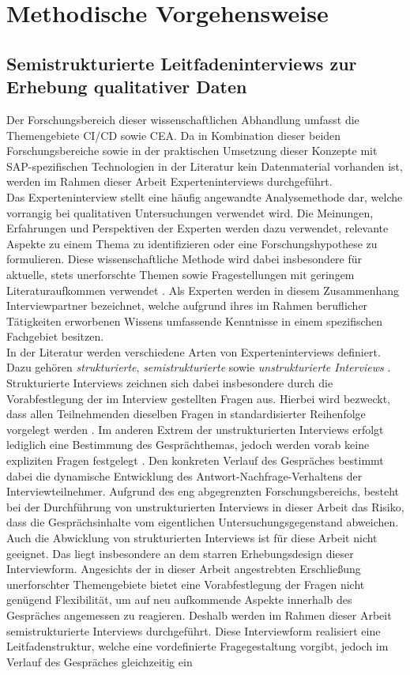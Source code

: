 \section{Methodische Vorgehensweise} 
\subsection{Semistrukturierte Leitfadeninterviews zur Erhebung qualitativer Daten}
Der Forschungsbereich dieser wissenschaftlichen Abhandlung umfasst die Themengebiete CI/CD sowie CEA. Da in Kombination dieser beiden Forschungsbereiche sowie in der praktischen Umsetzung dieser Konzepte mit SAP-spezifischen Technologien in der Literatur kein Datenmaterial vorhanden ist, werden im Rahmen dieser Arbeit Experteninterviews durchgeführt.\\ 
Das Experteninterview stellt eine häufig angewandte Analysemethode dar, welche vorrangig bei qualitativen Untersuchungen verwendet wird. Die Meinungen, Erfahrungen und Perspektiven der Experten werden dazu verwendet, relevante Aspekte zu einem Thema zu identifizieren oder eine Forschungshypothese zu formulieren. Diese wissenschaftliche Methode wird dabei insbesondere für aktuelle, stets unerforschte Themen sowie Fragestellungen mit geringem Literaturaufkommen verwendet \cite[S. 33 ff.]{Kaiser.2021}. Als Experten werden in diesem Zusammenhang Interviewpartner bezeichnet, welche aufgrund ihres im Rahmen beruflicher Tätigkeiten erworbenen Wissens umfassende Kenntnisse in einem spezifischen Fachgebiet besitzen.\\ In der Literatur werden verschiedene Arten von Experteninterviews definiert. Dazu gehören \textit{strukturierte}, \textit{semistrukturierte} sowie \textit{unstrukturierte Interviews} \cite[S. 84 ff.]{Kaiser.2021}. Strukturierte Interviews zeichnen sich dabei insbesondere durch die Vorabfestlegung der im Interview gestellten Fragen aus. Hierbei wird bezweckt, dass allen Teilnehmenden dieselben Fragen in standardisierter Reihenfolge vorgelegt werden \cite[S. 421 ff.]{Aghamanoukjan.2009}. Im anderen Extrem der unstrukturierten Interviews erfolgt lediglich eine Bestimmung des Gesprächthemas, jedoch werden vorab keine expliziten Fragen festgelegt \cite[S. 441 ff.]{Aghamanoukjan.2009}. Den konkreten Verlauf des Gespräches bestimmt dabei die dynamische Entwicklung des Antwort-Nachfrage-Verhaltens der Interviewteilnehmer. Aufgrund des eng abgegrenzten Forschungsbereichs, besteht bei der Durchführung von unstrukturierten Interviews in dieser Arbeit das Risiko, dass die Gesprächsinhalte vom eigentlichen Untersuchungsgegenstand abweichen. Auch die Abwicklung von strukturierten Interviews ist für diese Arbeit nicht geeignet. Das liegt insbesondere an dem starren Erhebungsdesign dieser Interviewform. Angesichts der in dieser Arbeit angestrebten Erschließung unerforschter Themengebiete bietet eine Vorabfestlegung der Fragen nicht genügend Flexibilität, um auf neu aufkommende Aspekte innerhalb des Gespräches angemessen zu reagieren. Deshalb werden im Rahmen dieser Arbeit semistrukturierte Interviews durchgeführt. Diese Interviewform realisiert eine Leitfadenstruktur, welche eine vordefinierte Fragegestaltung vorgibt, jedoch im Verlauf des Gespräches gleichzeitig ein 